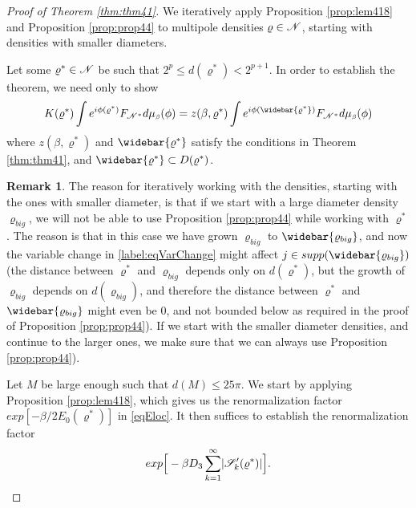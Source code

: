 \documentclass[11pt,reqno]{article}
\DeclarePairedDelimiter\abs{\lvert}{\rvert}%
\theoremstyle{definition}
\newtheorem*{remark}{Remark}
\numberwithin{equation}{section}
\begin{document}
\begin{proof}[Proof of Theorem \eqref{thm:thm41}]
We iteratively apply Proposition \eqref{prop:lem418} and Proposition \eqref{prop:prop44} to  multipole densities $\varrho \in \mathscr{N}$, starting with densities with smaller diameters. 

Let some $\varrho^* \in \mathscr{N}$ be such that $2^p \leq d(\varrho^*) < 2^{p+1}$. In order to establish the theorem, we need only to show
$$
K(\varrho^*)\int e^{i\phi(\varrho^*)}F_{\ens^*}\mida = z(\beta, \varrho^*) \int e^{i\phi(\widebar{\varrho^*})}F_{\ens^*}\mida
$$
where $z(\beta, \varrho^*)$ and $\widebar{\varrho^*}$ satisfy the conditions in Theorem \eqref{thm:thm41}, and $\widebar{\varrho^*} \subset D(\varrho^*)$.

\begin{remark}
The reason for iteratively working with the densities, starting with the ones with smaller diameter, is that if we start with a large diameter density $\varrho_{big}$, we will not be able to use Proposition \eqref{prop:prop44} while working with $\varrho^*$. The reason is that in this case we have grown $\varrho_{big}$ to $\widebar{\varrho_{big}}$, and now the variable change in \eqref{label:eqVarChange} might affect $j \in supp(\widebar{\varrho_{big}})$ (the distance between $\varrho^*$ and $\varrho_{big}$ depends only on $d(\varrho^*)$, but the growth of $\varrho_{big}$ depends on $d(\varrho_{big})$, and therefore the distance between $\varrho^*$ and $\widebar{\varrho_{big}}$ might even be 0, and not bounded below as required in the proof of Proposition \eqref{prop:prop44}). If we start with the smaller diameter densities, and continue to the larger ones, we make sure that we can always use Proposition \eqref{prop:prop44}).
\end{remark}


Let $M$ be large enough such that $d(M) \leq 25\pi$. 
We start by applying Proposition \eqref{prop:lem418}, which gives us the renormalization factor $exp[-\beta/2E_0(\varrho^*)]$ in \eqref{eqEloc}. It then suffices to establish the renormalization factor 
\begin{equation} \label{label:eq458}
exp\Big[-\beta D_3\sum_{k=1}^\infty \abs{\SqrsSetTagOf{k}{\varrho^*}}\Big].
\end{equation}


\end{proof}
\end{document}
